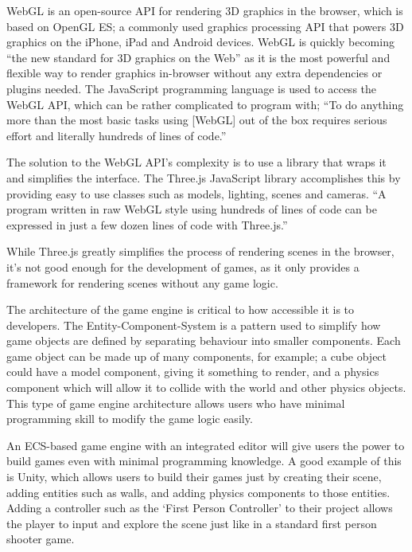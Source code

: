 \documentclass[a4paper, 12pt]{article}
\begin{document}
WebGL is an open-source API for rendering 3D graphics in the browser, which is based on OpenGL ES; a commonly used graphics processing API that powers 3D graphics on the iPhone, iPad and Android devices.\cite{parisi2012webgl} WebGL is quickly becoming ``the new standard for 3D graphics on the Web''\cite[p2]{parisi2012webgl} as it is the most powerful and flexible way to render graphics in-browser without any extra dependencies or plugins needed. The JavaScript programming language is used to access the WebGL API, which can be rather complicated to program with; ``To do anything more than the most basic tasks using [WebGL] out of the box requires serious effort and literally hundreds of lines of code.''\cite[p44]{parisi2014programming}

The solution to the WebGL API's complexity is to use a library that wraps it and simplifies the interface. The Three.js\cite{threejs} JavaScript library accomplishes this by providing easy to use classes such as models, lighting, scenes and cameras. ``A program written in raw WebGL style using hundreds of lines of code can be expressed in just a few dozen lines of code with Three.js.''\cite[p57]{parisi2014programming}

While Three.js greatly simplifies the process of rendering scenes in the browser, it's not good enough for the development of games, as it only provides a framework for rendering scenes without any game logic.

The architecture of the game engine is critical to how accessible it is to developers. The Entity-Component-System is a pattern used to simplify how game objects are defined by separating behaviour into smaller components. Each game object can be made up of many components, for example; a cube object could have a model component, giving it something to render, and a physics component which will allow it to collide with the world and other physics objects. This type of game engine architecture allows users who have minimal programming skill to modify the game logic easily.


An ECS-based game engine with an integrated editor will give users the power to build games even with minimal programming knowledge. A good example of this is Unity, which allows users to build their games just by creating their scene, adding entities such as walls, and adding physics components to those entities.\cite{unitycreatingscenes} Adding a controller such as the `First Person Controller' to their project allows the player to input and explore the scene just like in a standard first person shooter game.\cite{unitycharactercontrol}
\end{document}
